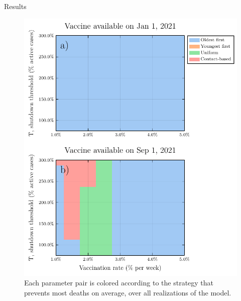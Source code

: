 \documentclass{beamer}
\begin{document}
\begin{frame}{Results}
    \begin{figure}
        \includegraphics[height = 0.7\textheight]{covid/bivariate_heatmap.pdf}
        
        \caption{Each parameter pair is colored according to the strategy that prevents most deaths on average, over all realizations of the model.}
    \end{figure}
\end{frame}
\end{document}
